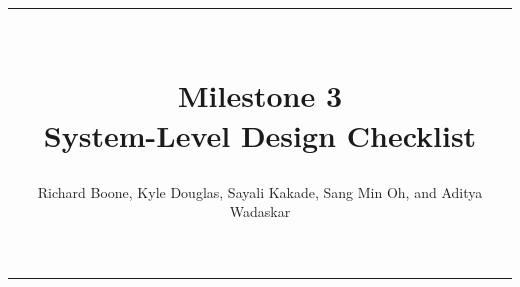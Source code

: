 \documentclass[12pt]{article}
\title{\rule{7in}{1pt} \\
	Milestone 3 \\ 
	\Large System-Level Design Checklist}
\author{Richard Boone, Kyle Douglas, Sayali Kakade, Sang Min Oh, and Aditya Wadaskar}
\begin{document}
\maketitle\vspace{-45pt}

\begin{center}
\rule{7in}{1pt}
\end{center}



\end{document}
